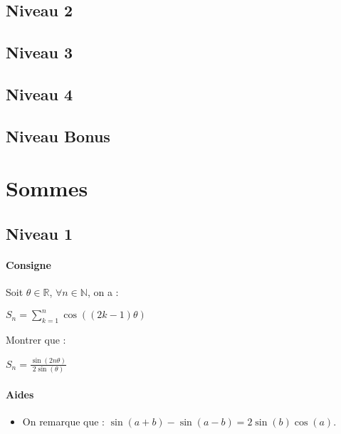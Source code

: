 \documentclass[a4paper]{report}
\newcounter{exnumber}
\begin{document}
			\subsection{Niveau 2}
		
			\subsection{Niveau 3}
			
			\subsection{Niveau 4}
			
			\subsection{Niveau Bonus}
		
		\section{Sommes}	
		
			\subsection{Niveau 1}
				\begin{tcolorbox}[colback=white,colframe=black,title=Exercice n°\arabic{exnumber} - Somme et fonctions trigonométriques]
				\paragraph{Consigne}
					Soit $\theta \in \mathbb{R}$, $\forall n \in \mathbb{N}$, on a :\\
					\begin{center}
						$S_n = \sum_{k=1}^{n} \cos ((2k-1)\theta)$
					\end{center}
					Montrer que :\\
					\begin{center}
						$S_n = \frac{\sin (2n \theta)}{2 \sin (\theta)}$
					\end{center}
					
				\tcblower					
					
				\paragraph{Aides}
					\begin{itemize}
						\item On remarque que : $\sin (a+b)- \sin (a-b)=2 \sin (b) \cos (a)$.
					\end{itemize}
				\end{tcolorbox}
				\addtocounter{exnumber}{1}
				
\end{document}
